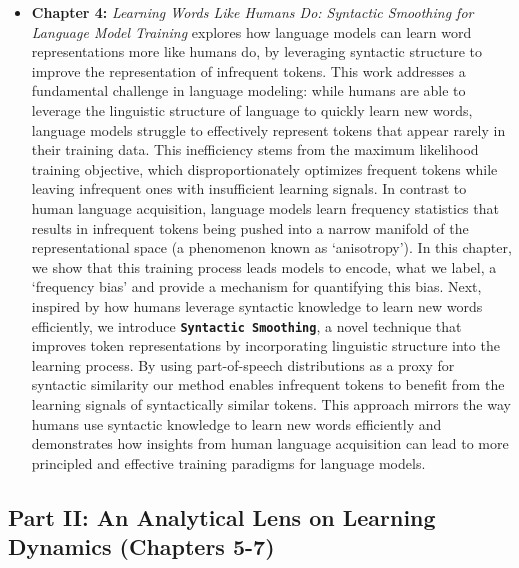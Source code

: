 \begin{itemize}
    \item \textbf{Chapter 4:} \emph{Learning Words Like Humans Do: Syntactic Smoothing for Language Model Training}  
    explores how language models can learn word representations more like humans do, by leveraging syntactic structure to improve the representation of infrequent tokens. This work addresses a fundamental challenge in language modeling: while humans are able to leverage the linguistic structure of language to quickly learn new words, language models struggle to effectively represent tokens that appear rarely in their training data. This inefficiency stems from the maximum likelihood training objective, which disproportionately optimizes frequent tokens while leaving infrequent ones with insufficient learning signals. In contrast to human language acquisition, language models learn frequency statistics that results in infrequent tokens being pushed into a narrow manifold of the representational space (a phenomenon known as `anisotropy'). 
    In this chapter, we show that this training process leads models to encode, what we label, a `frequency bias' and provide a mechanism for quantifying this bias. Next, inspired by how humans leverage syntactic knowledge to learn new words efficiently, we introduce \textbf{\texttt{Syntactic Smoothing}}, a novel technique that improves token representations by incorporating linguistic structure into the learning process. By using part-of-speech distributions as a proxy for syntactic similarity our method enables infrequent tokens to benefit from the learning signals of syntactically similar tokens. This approach mirrors the way humans use syntactic knowledge to learn new words efficiently and demonstrates how insights from human language acquisition can lead to more principled and effective training paradigms for language models.

\end{itemize}

\subsection*{Part II: An Analytical Lens on Learning Dynamics (Chapters 5-7)}

